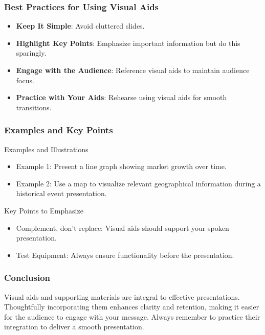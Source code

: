 \documentclass{beamer}
\begin{document}
\begin{frame}[fragile]
    \frametitle{Best Practices for Using Visual Aids}
    \begin{itemize}
        \item \textbf{Keep It Simple}: Avoid cluttered slides. 
        \item \textbf{Highlight Key Points}: Emphasize important information but do this sparingly.
        \item \textbf{Engage with the Audience}: Reference visual aids to maintain audience focus.
        \item \textbf{Practice with Your Aids}: Rehearse using visual aids for smooth transitions.
    \end{itemize}
\end{frame}

\begin{frame}[fragile]
    \frametitle{Examples and Key Points}
    \begin{block}{Examples and Illustrations}
        \begin{itemize}
            \item Example 1: Present a line graph showing market growth over time.
            \item Example 2: Use a map to visualize relevant geographical information during a historical event presentation.
        \end{itemize}
    \end{block}
    
    \begin{block}{Key Points to Emphasize}
        \begin{itemize}
            \item Complement, don’t replace: Visual aids should support your spoken presentation.
            \item Test Equipment: Always ensure functionality before the presentation.
        \end{itemize}
    \end{block}
\end{frame}

\begin{frame}[fragile]
    \frametitle{Conclusion}
    Visual aids and supporting materials are integral to effective presentations. 
    Thoughtfully incorporating them enhances clarity and retention, making it easier for the audience to engage with your message. 
    Always remember to practice their integration to deliver a smooth presentation.
\end{frame}
\end{document}
